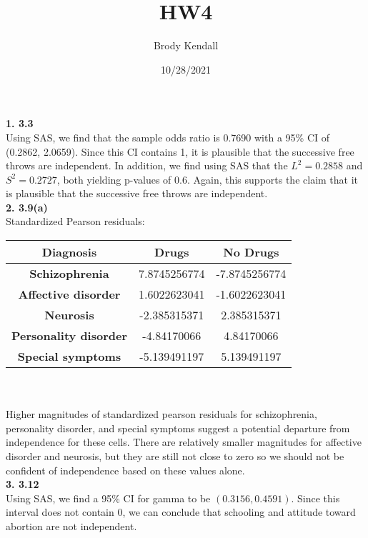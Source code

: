 \documentclass{article}
\title{HW4}
\author{Brody Kendall}
\date{10/28/2021}
\begin{document}
\maketitle

\textbf{1. 3.3}\\

Using SAS, we find that the sample odds ratio is 0.7690 with a 95\% CI of (0.2862, 2.0659). Since this CI contains 1, it is plausible that the successive free throws are independent. In addition, we find using SAS that the $L^2 = 0.2858$ and $S^2 = 0.2727$, both yielding p-values of $0.6$. Again, this supports the claim that it is plausible that the successive free throws are independent.
\\

\textbf{2. 3.9(a)}\\

Standardized Pearson residuals:

\begin{tabular}{ |c|c|c|  }
 \hline
 \textbf{Diagnosis} & \textbf{Drugs} & \textbf{No Drugs}\\
 \hline
 \textbf{Schizophrenia} & 7.8745256774 & -7.8745256774\\
 \hline
 \textbf{Affective disorder} & 1.6022623041 & -1.6022623041\\
 \hline
 \textbf{Neurosis} & -2.385315371 & 2.385315371\\
 \hline
 \textbf{Personality disorder} & -4.84170066 & 4.84170066\\
 \hline
 \textbf{Special symptoms} & -5.139491197 & 5.139491197\\
 \hline
\end{tabular}\\\\

Higher magnitudes of standardized pearson residuals for schizophrenia, personality disorder, and special symptoms suggest a potential departure from independence for these cells. There are relatively smaller magnitudes for affective disorder and neurosis, but they are still not close to zero so we should not be confident of independence based on these values alone.
\\

\textbf{3. 3.12}\\

Using SAS, we find a 95\% CI for gamma to be $(0.3156, 0.4591)$. Since this interval does not contain 0, we can conclude that schooling and attitude toward abortion are not independent.
\\
\end{document}
